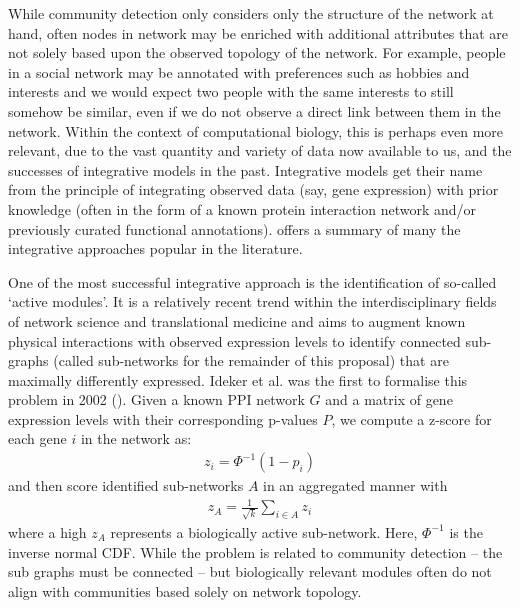 \documentclass[
11pt, %
english, %
singlespacing, %
headsepline, %
]{MastersDoctoralThesis} %
\begin{document}
While community detection only considers only the structure of the network at hand, often nodes in network may be enriched with additional attributes that are not solely based upon the observed topology of the network. For example, people in a social network may be annotated with preferences such as hobbies and interests and we would expect two people with the same interests to still somehow be similar, even if we do not observe a direct link between them in the network. Within the context of computational biology, this is perhaps even more relevant, due to the vast quantity and variety of data now available to us, and the successes of integrative models in the past. Integrative models get their name from the principle of integrating observed data (say, gene expression) with prior knowledge (often in the form of a known protein interaction network and/or previously curated functional annotations). \cite{mitra2013integrative} offers a summary of many the integrative approaches popular in the literature.

One of the most successful integrative approach is the identification of so-called `active modules'. It is a relatively recent trend within the interdisciplinary fields of network science and translational medicine and aims to augment known physical interactions with observed expression levels to identify connected sub-graphs (called sub-networks for the remainder of this proposal) that are maximally differently expressed. Ideker et al. was the first to formalise this problem in 2002 (\cite{ideker2002discovering}). Given a known PPI network $G$ and a matrix of gene expression levels with their corresponding p-values $P$, we compute a z-score for each gene $i$ in the network as:
\begin{align}
z_i = \Phi^{-1}(1 - p_i)
\end{align}
and then score identified sub-networks $A$ in an aggregated manner with 
\begin{align}
z_A = \frac{1}{\sqrt{k}}\sum_{i\in A}z_i
\label{ideker}
\end{align}
where a high $z_A$ represents a biologically active sub-network. Here, $\Phi^{-1}$ is the inverse normal CDF. While the problem is related to community detection -- the sub graphs must be connected -- but biologically relevant modules often do not align with communities based solely on network topology.
\end{document}
